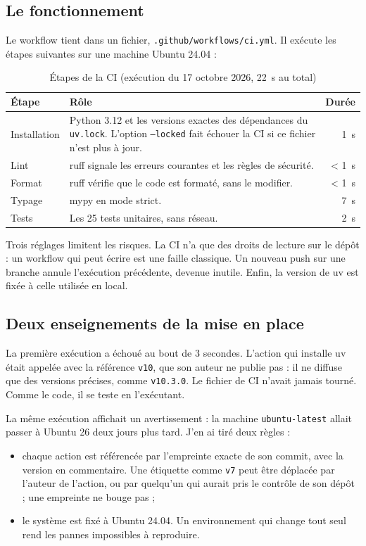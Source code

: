 \documentclass[11pt,a4paper]{article}
\begin{document}
\subsection{Le fonctionnement}

Le workflow tient dans un fichier, \nolinkurl{.github/workflows/ci.yml}. Il exécute les étapes suivantes sur une machine Ubuntu 24.04 :

\begin{table}[H]
\centering\small
\begin{tabularx}{\linewidth}{@{}l Y r@{}}
\toprule
Étape & Rôle & Durée \\
\midrule
Installation & Python 3.12 et les versions exactes des dépendances du \texttt{uv.lock}. L'option \texttt{--locked} fait échouer la CI si ce fichier n'est plus à jour. & 1~s \\
Lint & ruff signale les erreurs courantes et les règles de sécurité. & < 1~s \\
Format & ruff vérifie que le code est formaté, sans le modifier. & < 1~s \\
Typage & mypy en mode strict. & 7~s \\
Tests & Les 25 tests unitaires, sans réseau. & 2~s \\
\bottomrule
\end{tabularx}
\caption{Étapes de la CI (exécution du 17 octobre 2026, 22~s au total)}
\end{table}

Trois réglages limitent les risques. La CI n'a que des droits de lecture sur le dépôt : un workflow qui peut écrire est une faille classique. Un nouveau push sur une branche annule l'exécution précédente, devenue inutile. Enfin, la version de uv est fixée à celle utilisée en local.

\subsection{Deux enseignements de la mise en place}

La première exécution a échoué au bout de 3 secondes. L'action qui installe uv était appelée avec la référence \texttt{v10}, que son auteur ne publie pas : il ne diffuse que des versions précises, comme \texttt{v10.3.0}. Le fichier de CI n'avait jamais tourné. Comme le code, il se teste en l'exécutant.

La même exécution affichait un avertissement : la machine \nolinkurl{ubuntu-latest} allait passer à Ubuntu 26 deux jours plus tard. J'en ai tiré deux règles :
\begin{itemize}
  \item chaque action est référencée par l'empreinte exacte de son commit, avec la version en commentaire. Une étiquette comme \texttt{v7} peut être déplacée par l'auteur de l'action, ou par quelqu'un qui aurait pris le contrôle de son dépôt ; une empreinte ne bouge pas ;
  \item le système est fixé à Ubuntu 24.04. Un environnement qui change tout seul rend les pannes impossibles à reproduire.
\end{itemize}
\end{document}
